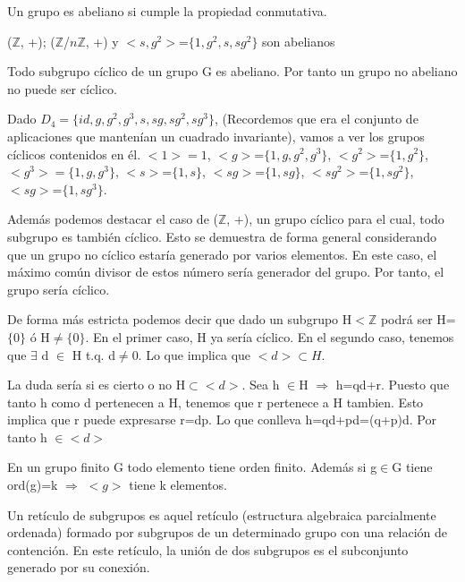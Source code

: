 \documentclass[a4paper,10pt]{apuntes}
\newenvironment{example}[1][Ejemplo]{\begin{trivlist}
\item[\hskip \labelsep {\bfseries #1}]}{\end{trivlist}}
\begin{document}
  \begin{defn}
   Un grupo es abeliano si cumple la propiedad conmutativa.
  \end{defn}

  \begin{example}
   ($\mathds{Z}$, +); ($\mathds{Z}$/$n\mathds{Z}$, +) y $<s,g^{2}>$=$\{1,g^{2},s,sg^{2}\}$ son abelianos
  \end{example}
  
  \begin{lemma}
   Todo subgrupo cíclico de un grupo G es abeliano. Por tanto un grupo no abeliano no puede ser cíclico.
  \end{lemma}

  \begin{example}
   Dado $D_{4}=\{id, g, g^{2}, g^{3}, s, sg, sg^{2},sg^{3}\}$, (Recordemos que era el conjunto de aplicaciones que mantenían un
   cuadrado invariante), vamos a ver los grupos cíclicos contenidos en él.
   $<1>={1}$, $<g>$=$\{1,g,g^{2}, g^{3}\}$, $<g^{2}>$=$\{1,g^{2}\}$, $<g^{3}>=\{1,g, g^{3}\}$, $<s>$=$\{1,s\}$, $<sg>$=$\{1, sg\}$, $<sg^{2}>$=$\{1, sg^{2}\}$, $<sg>$=$\{1, sg^{3}\}$.
   
   Además podemos destacar el caso de ($\mathds{Z}$, +), un grupo cíclico para el cual, todo subgrupo es también cíclico. Esto se demuestra
   de forma general considerando que un grupo no cíclico estaría generado por varios elementos. En este caso, el máximo común
   divisor de estos número sería generador del grupo. Por tanto, el grupo sería cíclico.
 
   De forma más estricta podemos decir que dado un subgrupo H$<\mathds{Z}$ podrá ser H=$\{0\}$ ó H$\neq\{0\}$. 
   En el primer caso, H ya sería cíclico. En el segundo caso, tenemos que $\exists$  d $\in$  H t.q. d$\neq$0. Lo que implica
   que $<d>\subset H$. 
   
   La duda sería si es cierto o no H$\subset <d>$. Sea h $\in$H  $\Rightarrow$  h=qd+r. Puesto que tanto h como d pertenecen a H,
   tenemos que r pertenece a H tambien. Esto implica que r puede expresarse r=dp. Lo que conlleva h=qd+pd=(q+p)d. Por tanto h $\in <d>$
  \end{example}
  \begin{theorem}
   En un grupo finito G todo elemento tiene orden finito. Además si g$\in$G tiene ord(g)=k $\Rightarrow$  $<g>$  tiene k elementos.
  \end{theorem}

  \begin{defn}
   Un retículo de subgrupos es aquel retículo (estructura algebraica parcialmente ordenada) formado por subgrupos de un determinado grupo
   con una relación de contención. En este retículo, la unión de dos subgrupos es el subconjunto generado por su conexión.
  \end{defn}
\end{document}
